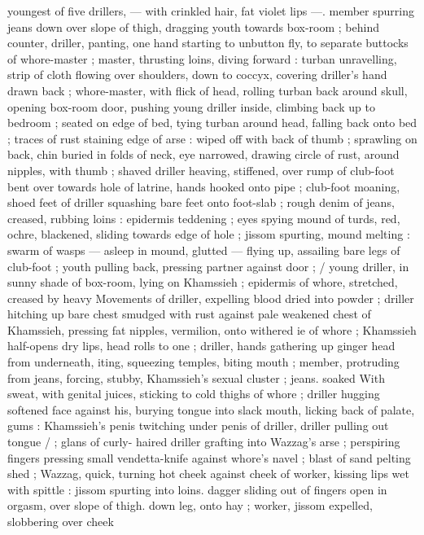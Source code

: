 youngest of five drillers, --- with crinkled hair, fat violet lips ---. 
member spurring jeans down over slope of thigh, dragging youth 
towards box-room ; behind counter, driller, panting, one hand 
starting to unbutton fly, to separate buttocks of whore-master ; 
master, thrusting loins, diving forward : turban unravelling, strip of 
cloth flowing over shoulders, down to coccyx, covering driller's hand 
drawn back ; whore-master, with flick of head, rolling turban back 
around skull, opening box-room door, pushing young driller inside, 
climbing back up to bedroom ; seated on edge of bed, tying turban 
around head, falling back onto bed ; traces of rust staining edge of 
arse : wiped off with back of thumb ; sprawling on back, chin buried 
in folds of neck, eye narrowed, drawing circle of rust, around 
nipples, with thumb ; shaved driller heaving, stiffened, over rump of 
club-foot bent over towards hole of latrine, hands hooked onto pipe 
; club-foot moaning, shoed feet of driller squashing bare feet onto 
foot-slab ; rough denim of jeans, creased, rubbing loins : epidermis 
teddening ; eyes spying mound of turds, red, ochre, blackened, 
sliding towards edge of hole ; jissom spurting, mound melting : 
swarm of wasps --- asleep in mound, glutted --- flying up, assailing 
bare legs of club-foot ; youth pulling back, pressing partner against 
door ; {\slash} young driller, in sunny shade of box-room, lying on 
Khamssieh ; epidermis of whore, stretched, creased by heavy 
Movements of driller, expelling blood dried into powder ; driller 
hitching up bare chest smudged with rust against pale weakened 
chest of Khamssieh, pressing fat nipples, vermilion, onto withered 
ie of whore ; Khamssieh half-opens dry lips, head rolls to one 
; driller, hands gathering up ginger head from underneath, 
iting, squeezing temples, biting mouth ; member, protruding from 
jeans, forcing, stubby, Khamssieh's sexual cluster ; jeans. soaked 
With sweat, with genital juices, sticking to cold thighs of whore ; 
driller hugging softened face against his, burying tongue into slack 
mouth, licking back of palate, gums : Khamssieh's penis twitching 
under penis of driller, driller pulling out tongue {\slash} ; glans of curly- 
haired driller grafting into Wazzag's arse ; perspiring fingers 
pressing small vendetta-knife against whore's navel ; blast of sand 
pelting shed ; Wazzag, quick, turning hot cheek against cheek of 
worker, kissing lips wet with spittle : jissom spurting into loins. 
dagger sliding out of fingers open in orgasm, over slope of thigh. 
down leg, onto hay ; worker, jissom expelled, slobbering over cheek 
